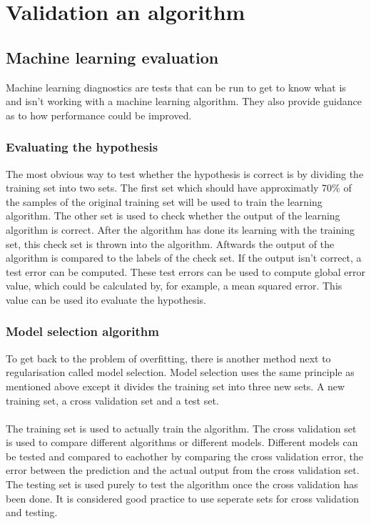 \chapter{Validation an algorithm}

\section{Machine learning evaluation}
Machine learning diagnostics are tests that can be run to get to know what is and isn't working with a machine learning algorithm. They also provide guidance as to how performance could be improved. 

\subsection{Evaluating the hypothesis}
The most obvious way to test whether the hypothesis is correct is by dividing the training set into two sets. The first set which should have approximatly 70\% of the samples of the original training set will be used to train the learning algorithm. The other set is used to check whether the output of the learning algorithm is correct. After the algorithm has done its learning with the training set, this check set is thrown into the algorithm. Aftwards the output of the algorithm is compared to the labels of the check set. If the output isn't correct, a test error can be computed. These test errors can be used to compute global error value, which could be calculated by, for example, a mean squared error. This value can be used ito evaluate the hypothesis. \cite{evalml}

\subsection{Model selection algorithm}
\label{modelselection}
To get back to the problem of overfitting, there is another method next to regularisation called model selection. Model selection uses the same principle as mentioned above except it divides the training set into three new sets. A new training set, a cross validation set and a test set. \\\\
The training set is used to actually train the algorithm. The cross validation set is used to compare different algorithms or different models. Different models can be tested and compared to eachother by comparing the cross validation error, the error between the prediction and the actual output from the cross validation set. The testing set is used purely to test the algorithm once the cross validation has been done. It is considered good practice to use seperate sets for cross validation and testing. \cite{wiki}

